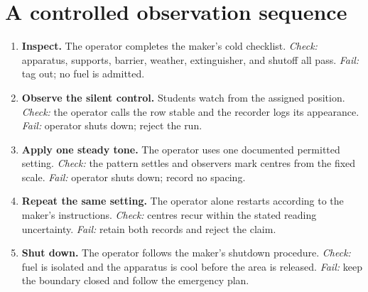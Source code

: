\section{A controlled observation sequence}
\begin{center}
\end{center}

\begin{enumerate}
\item \textbf{Inspect.} The operator completes the maker's cold checklist.
\emph{Check:} apparatus, supports, barrier, weather, extinguisher, and shutoff
all pass. \emph{Fail:} tag out; no fuel is admitted.
\item \textbf{Observe the silent control.} Students watch from the assigned
position. \emph{Check:} the operator calls the row stable and the recorder logs
its appearance. \emph{Fail:} operator shuts down; reject the run.
\item \textbf{Apply one steady tone.} The operator uses one documented permitted
setting. \emph{Check:} the pattern settles and observers mark centres from the
fixed scale. \emph{Fail:} operator shuts down; record no spacing.
\item \textbf{Repeat the same setting.} The operator alone restarts according to
the maker's instructions. \emph{Check:} centres recur within the stated reading
uncertainty. \emph{Fail:} retain both records and reject the claim.
\item \textbf{Shut down.} The operator follows the maker's shutdown procedure.
\emph{Check:} fuel is isolated and the apparatus is cool before the area is
released. \emph{Fail:} keep the boundary closed and follow the emergency plan.
\end{enumerate}

